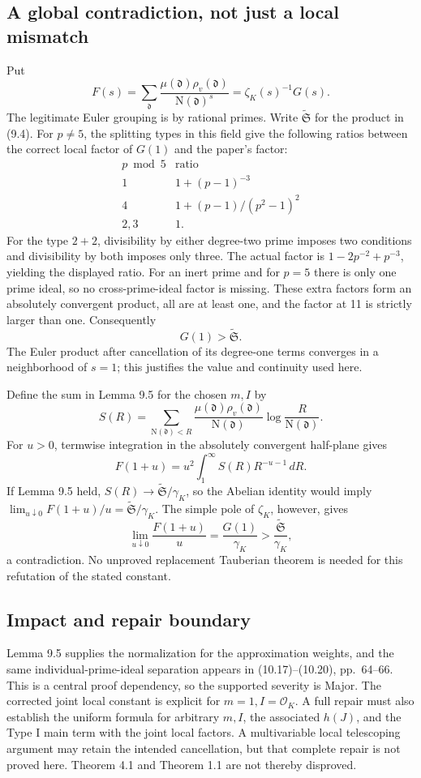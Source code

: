\documentclass[10pt]{article}
\begin{document}
\subsection*{A global contradiction, not just a local mismatch}
Put \[F(s)=\sum_{\mathfrak d}
 \frac{\mu(\mathfrak d)\rho_v(\mathfrak d)}{\mathrm N(\mathfrak d)^s}
 =\zeta_K(s)^{-1}G(s).\] The legitimate Euler grouping is by rational primes. Write \(\widetilde{\mathfrak S}\) for the product in (9.4). For \(p\ne5\), the splitting types in this field give the following ratios between the correct local factor of \(G(1)\) and the paper’s factor: \[\begin{array}{c|c}
 p\bmod5&\text{ratio}\\ \hline
 1&1+(p-1)^{-3}\\
 4&1+(p-1)/(p^2-1)^2\\
 2,3&1 .
 \end{array}\] For the type \(2+2\), divisibility by either degree-two prime imposes two conditions and divisibility by both imposes only three. The actual factor is \(1-2p^{-2}+p^{-3}\), yielding the displayed ratio. For an inert prime and for \(p=5\) there is only one prime ideal, so no cross-prime-ideal factor is missing. These extra factors form an absolutely convergent product, all are at least one, and the factor at 11 is strictly larger than one. Consequently \[G(1)>\widetilde{\mathfrak S}.\] The Euler product after cancellation of its degree-one terms converges in a neighborhood of \(s=1\); this justifies the value and continuity used here.\par
Define the sum in Lemma 9.5 for the chosen \(m,I\) by \[S(R)=\sum_{\mathrm N(\mathfrak d)<R}
 \frac{\mu(\mathfrak d)\rho_v(\mathfrak d)}{\mathrm N(\mathfrak d)}
 \log\frac R{\mathrm N(\mathfrak d)}.\] For \(u>0\), termwise integration in the absolutely convergent half-plane gives \[F(1+u)=u^2\int_1^\infty S(R)R^{-u-1}\,dR .\] If Lemma 9.5 held, \(S(R)\to\widetilde{\mathfrak S}/\gamma_K\), so the Abelian identity would imply \(\lim_{u\downarrow0}F(1+u)/u=\widetilde{\mathfrak S}/\gamma_K\). The simple pole of \(\zeta_K\), however, gives \[\lim_{u\downarrow0}\frac{F(1+u)}u=\frac{G(1)}{\gamma_K}
 >\frac{\widetilde{\mathfrak S}}{\gamma_K},\] a contradiction. No unproved replacement Tauberian theorem is needed for this refutation of the stated constant.\par
\subsection*{Impact and repair boundary}
Lemma 9.5 supplies the normalization for the approximation weights, and the same individual-prime-ideal separation appears in (10.17)–(10.20), pp. 64–66. This is a central proof dependency, so the supported severity is Major. The corrected joint local constant is explicit for \(m=1,I=\mathcal O_K\). A full repair must also establish the uniform formula for arbitrary \(m,I\), the associated \(h(J)\), and the Type I main term with the joint local factors. A multivariable local telescoping argument may retain the intended cancellation, but that complete repair is not proved here. Theorem 4.1 and Theorem 1.1 are not thereby disproved.\par
\end{document}
